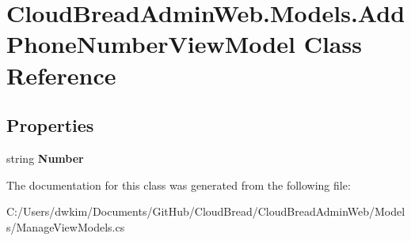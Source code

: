 \hypertarget{class_cloud_bread_admin_web_1_1_models_1_1_add_phone_number_view_model}{}\section{Cloud\+Bread\+Admin\+Web.\+Models.\+Add\+Phone\+Number\+View\+Model Class Reference}
\label{class_cloud_bread_admin_web_1_1_models_1_1_add_phone_number_view_model}
\subsection*{Properties}
\begin{DoxyCompactItemize}
\item 
string {\bfseries Number}\hypertarget{class_cloud_bread_admin_web_1_1_models_1_1_add_phone_number_view_model_ac981dffb33a13c066b34c9c8e7b39c03}{}\label{class_cloud_bread_admin_web_1_1_models_1_1_add_phone_number_view_model_ac981dffb33a13c066b34c9c8e7b39c03}

\end{DoxyCompactItemize}


The documentation for this class was generated from the following file\+:\begin{DoxyCompactItemize}
\item 
C\+:/\+Users/dwkim/\+Documents/\+Git\+Hub/\+Cloud\+Bread/\+Cloud\+Bread\+Admin\+Web/\+Models/Manage\+View\+Models.\+cs\end{DoxyCompactItemize}
